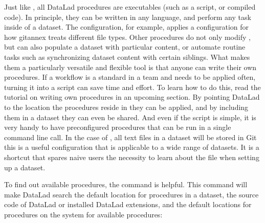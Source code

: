 \sphinxAtStartPar
Just like , all DataLad procedures are
executables (such as a script, or compiled code).
In principle, they can be written in any language, and perform
any task inside of a dataset.
The  configuration, for example, applies a configuration for how
git\sphinxhyphen{}annex treats different file types. Other procedures do not
only modify , but can also populate a dataset
with particular content, or automate routine tasks such as
synchronizing dataset content with certain siblings.
What makes them a particularly versatile and flexible tool is
that anyone can write their own procedures.
If a workflow is a standard in a team and needs to be applied often, turning it into
a script can save time and effort.
To learn how to do this, read the tutorial on writing own procedures in an upcoming section.
By pointing DataLad to the location the procedures reside in they can be applied, and by
including them in a dataset they can even be shared.
And even if the script is simple, it is very handy to have preconfigured
procedures that can be run in a single command line call. In the
case of , all text files in a dataset will be stored
in Git \textendash{} this is a useful configuration that is applicable to a
wide range of datasets. It is a shortcut that
spares naive users the necessity to learn about the 
file when setting up a dataset.

\ignorespaces 
\sphinxAtStartPar
To find out available procedures, the command
 is helpful.
This command will make DataLad search the default location for
procedures in a dataset, the source code of DataLad or
installed DataLad extensions, and the default locations for
procedures on the system for available procedures:


